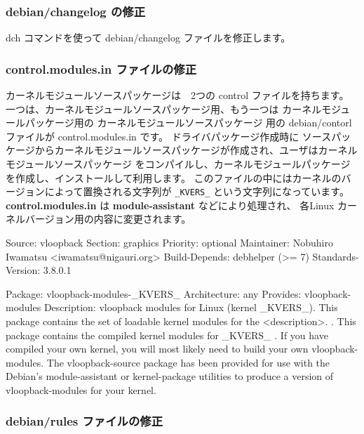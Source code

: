 \documentclass[mingoth,a4paper]{jsarticle}
\begin{document}
\subsubsection{debian/changelog の修正}
dch コマンドを使って debian/changelog ファイルを修正します。

\subsubsection{control.modules.in ファイルの修正}
カーネルモジュールソースパッケージは　2つの control ファイルを持ちます。
一つは、カーネルモジュールソースパッケージ用、もう一つは カーネルモジュールパッケージ用の
カーネルモジュールソースパッケージ 用の debian/contorl ファイルが control.modules.in です。
ドライバパッケージ作成時に 
ソースパッケージからカーネルモジュールソースパッケージが作成され、ユーザはカーネルモジュールソースパッケージ
をコンパイルし、カーネルモジュールパッケージを作成し、インストールして利用します。
このファイルの中にはカーネルのバージョンによって置換される文字列が \texttt{\_KVERS\_} という文字列になっています。
{\bf control.modules.in} は {\bf module-assistant} などにより処理され、
各Linux カーネルバージョン用の内容に変更されます。

\begin{commandline}
Source: vloopback
Section: graphics
Priority: optional
Maintainer: Nobuhiro Iwamatsu <iwamatsu@nigauri.org>
Build-Depends: debhelper (>= 7)
Standards-Version: 3.8.0.1

Package: vloopback-modules-_KVERS_
Architecture: any
Provides: vloopback-modules
Description: vloopback modules for Linux (kernel _KVERS_).
 This package contains the set of loadable kernel modules for the
 <description>.
 .
 This package contains the compiled kernel modules for _KVERS_
 .
 If you have compiled your own kernel, you will most likely need to build
 your own vloopback-modules. The vloopback-source package has been
 provided for use with the Debian's module-assistant or kernel-package
 utilities to produce a version of vloopback-modules for your kernel.
\end{commandline}

\subsubsection{debian/rules ファイルの修正}
\end{document}
